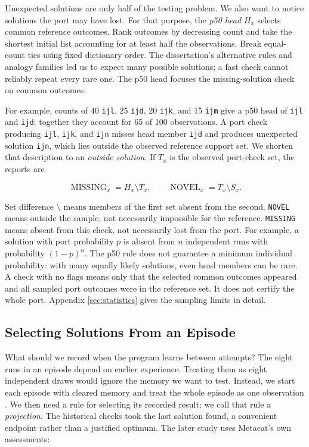 \documentclass[10pt,letterpaper]{article}
\begin{document}
Unexpected solutions are only half of the testing problem. We also want to notice
solutions the port may have lost. For that purpose, the \emph{p50 head} \(H_x\) selects
common reference outcomes. Rank outcomes by decreasing count and take the shortest initial
list accounting for at least half the observations. Break equal-count ties using fixed
dictionary order. The dissertation's alternative rules and analogy families
\citep[Chapters 3 and 5]{ref21} led us to expect many possible solutions; a fast check
cannot reliably repeat every rare one. The p50 head focuses the missing-solution check on
common outcomes.

For example, counts of 40 \texttt{ijl}, 25 \texttt{ijd}, 20 \texttt{ijk}, and 15
\texttt{ijm} give a p50 head of \texttt{ijl} and \texttt{ijd}: together they account for
65 of 100 observations. A port check producing \texttt{ijl}, \texttt{ijk}, and
\texttt{ijn} misses head member \texttt{ijd} and produces unexpected solution
\texttt{ijn}, which lies outside the observed reference support set. We shorten that
description to an \emph{outside solution}. If \(T_x\) is the observed port-check set, the
reports are

\[
\operatorname{MISSING}_x=H_x\setminus T_x,\qquad
\operatorname{NOVEL}_x=T_x\setminus S_x.
\]

Set difference \(\setminus\) means members of the first set absent from the second.
\texttt{NOVEL} means outside the sample, not necessarily impossible for the reference.
\texttt{MISSING} means absent from this check, not necessarily lost from the port. For
example, a solution with port probability \(p\) is absent from \(n\) independent runs with
probability \((1-p)^n\). The p50 rule does not guarantee a minimum individual probability:
with many equally likely solutions, even head members can be rare. A check with no flags
means only that the selected common outcomes appeared and all sampled port outcomes were
in the reference set. It does not certify the whole port. Appendix \ref{sec:statistics}
gives the sampling limits in detail.

\subsection{Selecting Solutions From an Episode}\label{sec:main-episodes}

What should we record when the program learns between attempts? The eight runs in an
episode depend on earlier experience. Treating them as eight independent draws would
ignore the memory we want to test. Instead, we start each episode with cleared memory and
treat the whole episode as one observation \citep{ref34}. We then need a rule for
selecting its recorded result; we call that rule a \emph{projection}. The historical
checks took the last solution found, a convenient endpoint rather than a justified
optimum. The later study uses Metacat's own assessments:
\end{document}
